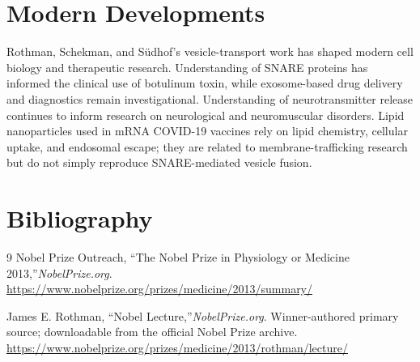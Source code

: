 \section{Modern Developments}

Rothman, Schekman, and Südhof's vesicle-transport work has shaped modern cell biology and therapeutic research. Understanding of SNARE proteins has informed the clinical use of botulinum toxin, while exosome-based drug delivery and diagnostics remain investigational. Understanding of neurotransmitter release continues to inform research on neurological and neuromuscular disorders. Lipid nanoparticles used in mRNA COVID-19 vaccines rely on lipid chemistry, cellular uptake, and endosomal escape; they are related to membrane-trafficking research but do not simply reproduce SNARE-mediated vesicle fusion.


\section{Bibliography}

\begin{thebibliography}{9}
Nobel Prize Outreach, ``The Nobel Prize in Physiology or Medicine 2013,''\emph{NobelPrize.org}.\\
\url{https://www.nobelprize.org/prizes/medicine/2013/summary/}

James E. Rothman, ``Nobel Lecture,''\emph{NobelPrize.org}. Winner-authored primary source; downloadable from the official Nobel Prize archive.\\
\url{https://www.nobelprize.org/prizes/medicine/2013/rothman/lecture/}
\end{thebibliography}
